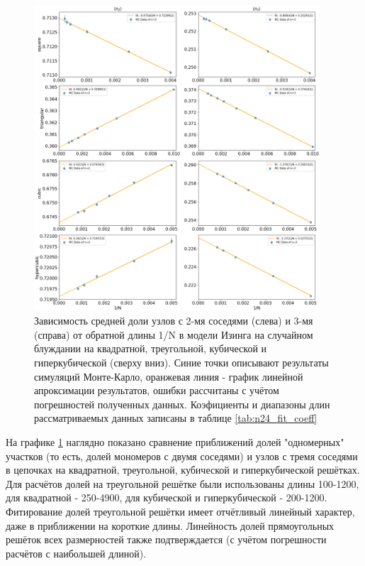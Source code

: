 \begin{figure}
    \centering
    \includegraphics[width=0.95\textwidth]{Sections/Images/n23_linear.png}
    \caption{Зависимость средней доли узлов с 2-мя соседями (слева) и 3-мя (справа) от обратной длины 1/N в модели Изинга на случайном блуждании на квадратной, треугольной, кубической и гиперкубической (сверху вниз). Синие точки описывают результаты симуляций Монте-Карло, оранжевая линия - график линейной апроксимации результатов, ошибки рассчитаны с учётом погрешностей полученных данных. Коэфициенты и диапазоны длин рассматриваемых данных записаны в таблице \ref{tab:n24_fit_coeff}}
    \label{fig:all_n23_bulk}
\end{figure}

На графике \ref{fig:all_n23_bulk} наглядно показано сравнение приближений долей "одномерных" участков (то есть, долей мономеров с двумя соседями) и узлов с тремя соседями в цепочках на квадратной, треугольной, кубической и гиперкубической решётках. Для расчётов долей на треугольной решётке были использованы длины 100-1200, для квадратной - 250-4900, для кубической и гиперкубической - 200-1200. Фитирование долей треугольной решётки имеет отчётливый линейный характер, даже в приближении на короткие длины. Линейность долей прямоугольных решёток всех размерностей также подтверждается (с учётом погрешности расчётов с наибольшей длиной). 

